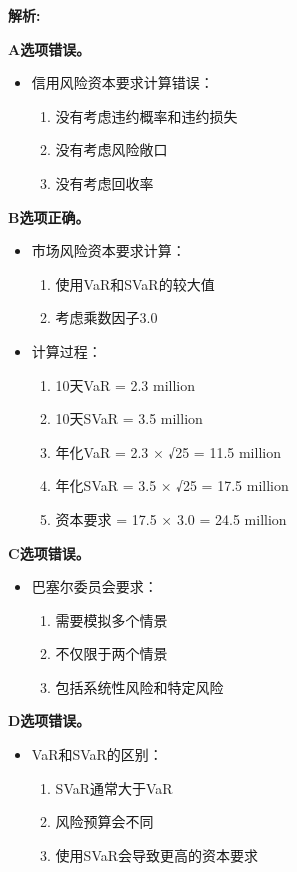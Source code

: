 \documentclass{article}
\newenvironment{explanation}
{\textbf{解析:}\par}
{\par}
\begin{document}
\begin{explanation}
    \textbf{A选项错误。}
    \begin{itemize}
        \item 信用风险资本要求计算错误：
        \begin{enumerate}
            \item 没有考虑违约概率和违约损失
            \item 没有考虑风险敞口
            \item 没有考虑回收率
        \end{enumerate}
    \end{itemize}
    
    \textbf{B选项正确。}
    \begin{itemize}
        \item 市场风险资本要求计算：
        \begin{enumerate}
            \item 使用VaR和SVaR的较大值
            \item 考虑乘数因子3.0
        \end{enumerate}
        \item 计算过程：
        \begin{enumerate}
            \item 10天VaR = 2.3 million
            \item 10天SVaR = 3.5 million
            \item 年化VaR = 2.3 × √25 = 11.5 million
            \item 年化SVaR = 3.5 × √25 = 17.5 million
            \item 资本要求 = 17.5 × 3.0 = 24.5 million
        \end{enumerate}
    \end{itemize}
    
    \textbf{C选项错误。}
    \begin{itemize}
        \item 巴塞尔委员会要求：
        \begin{enumerate}
            \item 需要模拟多个情景
            \item 不仅限于两个情景
            \item 包括系统性风险和特定风险
        \end{enumerate}
    \end{itemize}
    
    \textbf{D选项错误。}
    \begin{itemize}
        \item VaR和SVaR的区别：
        \begin{enumerate}
            \item SVaR通常大于VaR
            \item 风险预算会不同
            \item 使用SVaR会导致更高的资本要求
        \end{enumerate}
    \end{itemize}
\end{explanation}
\end{document}
